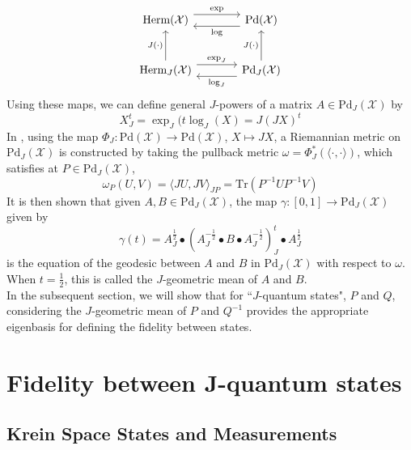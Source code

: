 \documentclass{amsart}
\numberwithin{equation}{section}
\theoremstyle{definition}
\theoremstyle{plain}
\theoremstyle{solutionstyle}
\begin{document}
\begin{equation*}
\begin{tikzcd}[column sep=large, row sep=large]
\mathrm{Herm}(\mathcal{X})
  \arrow[r, shift left=1.2ex, "\exp"]
&
\mathrm{Pd}(\mathcal{X})
  \arrow[l, shift left=1.2ex, "\log"]
\\
\mathrm{Herm}_{J}(\mathcal{X})
  \arrow[u, "J(\cdot)"]
  \arrow[r, shift left=1.2ex, "\exp_{J}"]
&
\mathrm{Pd}_{J}(\mathcal{X})
  \arrow[l, shift left=1.2ex, "\log_{J}"]
  \arrow[u, "J(\cdot)"]
\end{tikzcd}
\end{equation*}
 Using these maps, we can define general $J$-powers of a matrix $A\in\mathrm{Pd}_J(\mathcal{X})$ by 
\begin{equation*}X_J^t=\exp_J(t\log_J(X)=J(JX)^t\end{equation*}
In \cite{franco2026conejhermitianmatricesgeometric}, using the map $\Phi_J:\mathrm{Pd}(\mathcal{X})\to \mathrm{Pd}(\mathcal{X})$, $X\mapsto JX$, a Riemannian metric on $\mathrm{Pd}_J(\mathcal{X})$ is constructed by taking the pullback metric $\omega=\Phi^*_J(\langle\cdot,\cdot\rangle)$, which satisfies at $P\in \mathrm{Pd}_J(\mathcal{X})$, 
\begin{equation*}\omega_P(U,V)=\langle JU,JV\rangle_{JP}=\mathrm{Tr}(P^{-1}UP^{-1}V)\end{equation*}
It is then shown that given $A,B\in \mathrm{Pd}_J(\mathcal{X})$, the map $\gamma:[0,1]\to \mathrm{Pd}_J(\mathcal{X})$ given by 
\begin{equation*}\gamma(t)= A_J^\frac{1}{2}\bullet(A_J^{-\frac{1}{2}}\bullet B\bullet A_J^{-\frac{1}{2}})^t_J\bullet A_J^{\frac{1}{2}}\end{equation*} is the equation of the geodesic between $A$ and $B$ in $\mathrm{Pd}_J(\mathcal{X})$ with respect to $\omega$. When $t=\frac{1}{2}$, this is called the $J$-geometric mean of $A$ and $B$.\\
In the subsequent section, we will show that for ``$J$-quantum states", $P$ and $Q$, considering the $J$-geometric mean of $P$ and $Q^{-1}$ provides the appropriate eigenbasis for defining the fidelity between states.

\section{Fidelity between J-quantum  states}\label{Section 5}

\subsection{Krein Space States and Measurements}
\end{document}
